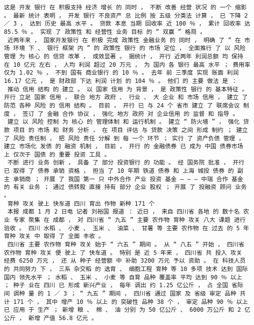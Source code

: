 \documentclass{article}
\begin{document}
\begin{Verbatim}[commandchars=\\\{\}]
 这是 开发 银行 在 积极支持 经济 增长 的 同时 ， 不断 改善 经营 状况 的 一个 缩影 。 最新 统计 表明 ， 开发 银行 不良资产 总 比例 按 五级 分类法 计算 ， 已 下降 2 ／ 3 ， 达到 历史 最高 水平 。 贷款 本息 当期 回收率 近 100 ％ ， 累计 回收率 达 85.5 ％ 。 实现 了 政策性 和 经营性 业务 目标 的 “ 双赢 ” 格局 。 
 近两年来 ， 国家开发银行 在 积极 完成 政策性 金融业务 的 同时 ， 明确 了 “ 在 市场 环境 下 、 银行 框架 内 ” 的 政策性 银行 的 市场 定位 ， 全面推行 了 以 风险管理 为 核心 的 信贷 改革 ， 成效显著 。 据统计 ， 开行 近两年 利润总额 均 保持 在 10 亿元 左右 ， 人均 利润 超过 20 万元 ， 为 国内 各 银行 最高 水平 ； 费用率 仅为 1.02 ％ ， 不到 国有 商业银行 的 10 ％ 。 去年 前 三季度 实现 账面 利润 16.17 亿元 ， 是 财政部 下达 利润 计划 的 104 ％ 。 他们 的 主要 做法 是 ： 
 推动 信用 结构 的 建立 。 以 国家 信用 为 背景 ， 是 政策性 银行 的 基本特征 。 开行 立足 国家 信用 ， 联合 地方 政府 、 行业 、 大 企业 和 市场 信用 ， 建立 了 防范 各种 风险 的 信用 结构 。 目前 ， 开行 已 与 24 个 省市 建立 了 联席会议 制度 ， 签订 了 金融 合作 协议 ， 强化 地方 政府 对 企业信用 的 监督 和 指导 。 
 建立 以 风险 控制 为 核心 的 管理体制 和 运行机制 。 建立 “ 防火墙 ” ， 强化 贷款 项目 的 市场 和 财务 分析 ， 在 项目 评估 与 贷款 决策 之间 形成 制约 ； 建立 了 风险 责任制 ， 把 风险 责任 分解 到 每 一个 环节 ； 实行 了 资产负债 管理 ， 建立 市场化 发债 的 融资 机制 ， 目前 ， 开行 的 金融债券 已 成为 中国 债券市场 上 仅次于 国债 的 重要 投资 工具 。 
 不断 进行 业务 创新 ， 具备 了 部分 投资银行 的 功能 。 经 国务院 批准 ， 开行 已 取得 了 债券 承销 资格 ， 担当 了 10 年期 铁道 债券 和 上海 城投 债券 的 副 主 承销商 ； 开展 了 我国 第一 只 中外合作 产业 投资 基金 — — — 中瑞 合作 基金 的 有关 业务 ； 通过 债转股 直接 持有 部分 企业 股权 ； 开展 了 投融资 顾问 业务 。 
 育种 攻关 驶上 快车道 四川 育出 作物 新种 171 个 
 本报 成都 1 月 2 日电 记者 刘裕国 报道 ： 近日 ， 来自 四川省 各地 的 数十名 农业 专家 聚集 在 成都 ， 对 四川省 “ 九五 ” 主要 农作物 育种 攻关 八大 课题 进行 验收 。 四川 水稻 、 小麦 、 玉米 、 油菜 、 甘薯 等 主要 农作物 在 过去 的 5 年 育种 攻关 中 取得 了 全面 丰收 。 
 四川省 主要 农作物 育种 攻关 始于 “ 六五 ” 期间 。 从 “ 八五 ” 开始 ， 四川省 农作物 育种 攻关 便 驶上 了 快车道 。 特别 是 近 5 年来 ， 四川省 共 投入 攻关 经费 6250 万元 ， 还 从 种子 经营额 中 补助 3200 万元 予以 资助 。 在 科技人员 的 共同努力 下 ， 三系 杂交稻 的 选育 、 细胞工程 育种 等 10 多项 技术 达到 国际 国内 领先水平 ； 水稻 、 玉米 、 小麦 等 自育 品种 覆盖率 平均 达到 90 ％ 以上 ； 种子 业在 四川 已 形成 新兴产业 ， 每年 调出 约 1.25 亿公斤 ， 占 全国 省际 间 调种 量 的 1 ／ 3 ； “ 九五 ” 期间 ， 四川省 通过 国家 及 省级 审定 品种 共计 171 个 ， 其中 增产 10 ％ 以上 的 突破性 品种 38 个 ， 审定 品种 90 ％ 以上 已 应用 于 生产 ； 新增 粮 、 棉 、 油 分别 为 50 亿公斤 、 6000 万公斤 和 2 亿公斤 ， 新增 产值 56.8 亿元 。 

\end{Verbatim}
\end{document}
